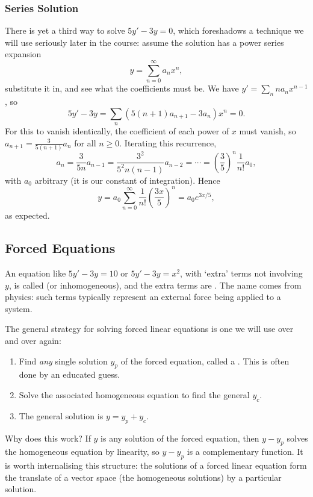 \documentclass[a4paper]{scrartcl}
\begin{document}
\subsubsection{Series Solution}

There is yet a third way to solve $5y' - 3y = 0$, which foreshadows a technique we will use seriously later in the course: assume the solution has a power series expansion
$$
y = \sum_{n = 0}^{\infty} a_n x^n,
$$
substitute it in, and see what the coefficients must be. We have $y' = \sum_n n a_n x^{n - 1}$, so
$$
5y' - 3y = \sum_{n} \left(5 (n+1) a_{n+1} - 3a_n\right) x^n = 0.
$$
For this to vanish identically, the coefficient of each power of $x$ must vanish, so $a_{n+1} = \frac{3}{5(n+1)} a_n$ for all $n \geq 0$. Iterating this recurrence,
$$
a_n = \frac{3}{5n} a_{n - 1} = \frac{3^2}{5^2 n (n-1)} a_{n - 2} = \cdots = \left(\frac{3}{5}\right)^n \frac{1}{n!} a_0,
$$
with $a_0$ arbitrary (it is our constant of integration). Hence
$$
y = a_0 \sum_{n = 0}^{\infty} \frac{1}{n!}\left(\frac{3x}{5}\right)^n = a_0 e^{3x/5},
$$
as expected.

\subsection{Forced Equations}

An equation like $5y' - 3y = 10$ or $5y' - 3y = x^2$, with `extra' terms not involving $y$, is called  (or inhomogeneous), and the extra terms are . The name comes from physics: such terms typically represent an external force being applied to a system.

The general strategy for solving forced linear equations is one we will use over and over again:
\begin{enumerate}[label=(\arabic*)]
	\item Find \emph{any} single solution $y_p$ of the forced equation, called a . This is often done by an educated guess.
	\item Solve the associated homogeneous equation to find the general  $y_c$.
	\item The general solution is $y = y_p + y_c$.
\end{enumerate}
Why does this work? If $y$ is any solution of the forced equation, then $y - y_p$ solves the homogeneous equation by linearity, so $y - y_p$ is a complementary function. It is worth internalising this structure: the solutions of a forced linear equation form the translate of a vector space (the homogeneous solutions) by a particular solution.
\end{document}
